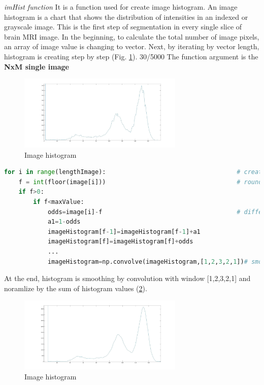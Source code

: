 \textit{imHist function}
It is a function used for create image histogram. An image histogram is a chart that shows the distribution of intensities in an indexed or grayscale image. This is the first step of segmentation in every single slice of brain MRI image. In the beginning, to calculate the total number of image pixels, an array of image value is changing to vector. Next, by iterating by vector length, histogram is creating step by step (Fig. \ref{fig:figures/m09_11}). 
30/5000
The function argument is the \textbf{NxM single image}

\begin{figure}[H]
	\centering{}\includegraphics[width=0.7\textwidth]{figures/Module_09/m09_11}
	\caption{Image histogram  
	\label{fig:figures/m09_11}}
\end{figure} 

\begin{lstlisting}[language=Python, caption = Create image histogram]
for i in range(lengthImage):									# create histogram of non-zero image values
    f = int(floor(image[i]))									# round floor
    if f>0:
        if f<maxValue:
            odds=image[i]-f             						# difference between image and round floor image value
            a1=1-odds
            imageHistogram[f-1]=imageHistogram[f-1]+a1
            imageHistogram[f]=imageHistogram[f]+odds
            ...
            imageHistogram=np.convolve(imageHistogram,[1,2,3,2,1])# smoothing the histogram
\end{lstlisting}

At the end, histogram is smoothing by convolution with window [1,2,3,2,1] and noramlize by the sum of histogram values (\ref{fig:figures/m09_12}).

\begin{figure}[H]
	\centering{}\includegraphics[width=0.7\textwidth]{figures/Module_09/m09_12}
	\caption{Image histogram  
	\label{fig:figures/m09_12}}
\end{figure} 
\\

